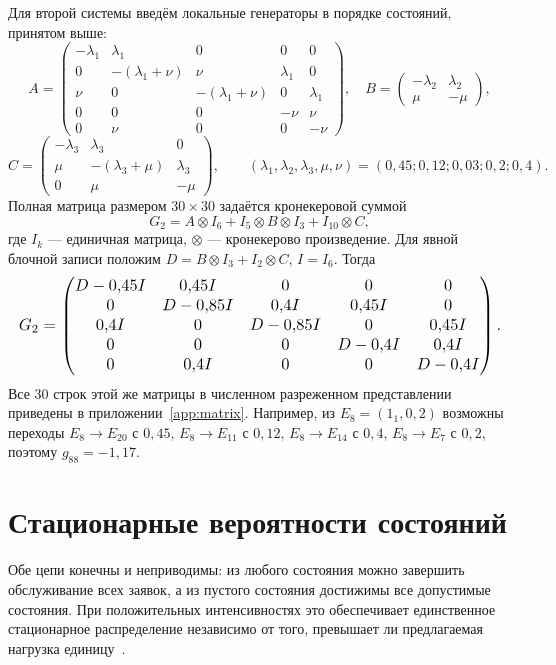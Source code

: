 \documentclass[a4paper,12pt]{article}
\begin{document}
Для второй системы введём локальные генераторы в порядке состояний, принятом выше:
\[
A=\begin{pmatrix}
-\lambda_1&\lambda_1&0&0&0\\
0&-(\lambda_1+\nu)&\nu&\lambda_1&0\\
\nu&0&-(\lambda_1+\nu)&0&\lambda_1\\
0&0&0&-\nu&\nu\\
0&\nu&0&0&-\nu
\end{pmatrix},\quad
B=\begin{pmatrix}-\lambda_2&\lambda_2\\\mu&-\mu\end{pmatrix},
\]
\[
C=\begin{pmatrix}
-\lambda_3&\lambda_3&0\\
\mu&-(\lambda_3+\mu)&\lambda_3\\
0&\mu&-\mu
\end{pmatrix},\qquad
(\lambda_1,\lambda_2,\lambda_3,\mu,\nu)=(0{,}45;0{,}12;0{,}03;0{,}2;0{,}4).
\]
Полная матрица размером $30\times30$ задаётся кронекеровой суммой
\begin{equation}\label{eq:q2}
G_2=A\otimes I_6+I_5\otimes B\otimes I_3+I_{10}\otimes C,
\end{equation}
где $I_k$ --- единичная матрица, $\otimes$ --- кронекерово произведение. Для явной блочной записи положим $D=B\otimes I_3+I_2\otimes C$, $I=I_6$. Тогда
\[
\resizebox{\linewidth}{!}{$G_2=\begin{pmatrix}
D-0{,}45I&0{,}45I&0&0&0\\
0&D-0{,}85I&0{,}4I&0{,}45I&0\\
0{,}4I&0&D-0{,}85I&0&0{,}45I\\
0&0&0&D-0{,}4I&0{,}4I\\
0&0{,}4I&0&0&D-0{,}4I
\end{pmatrix}.$}
\]
Все 30 строк этой же матрицы в численном разреженном представлении приведены в приложении~\ref{app:matrix}. Например, из $E_8=(1_1,0,2)$ возможны переходы $E_8\to E_{20}$ с $0{,}45$, $E_8\to E_{11}$ с $0{,}12$, $E_8\to E_{14}$ с $0{,}4$, $E_8\to E_7$ с $0{,}2$, поэтому $g_{88}=-1{,}17$.

\section{Стационарные вероятности состояний}
Обе цепи конечны и неприводимы: из любого состояния можно завершить обслуживание всех заявок, а из пустого состояния достижимы все допустимые состояния. При положительных интенсивностях это обеспечивает единственное стационарное распределение независимо от того, превышает ли предлагаемая нагрузка единицу~\cite{theory,slides}.
\end{document}
